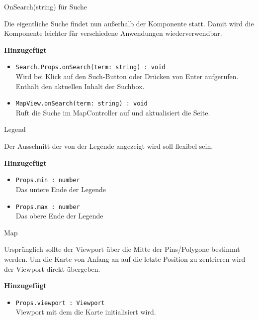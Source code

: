 \begin{Change}{OnSearch(string) für Suche}
    
    Die eigentliche Suche findet nun außerhalb der Komponente statt.
    Damit wird die Komponente leichter für verschiedene Anwendungen wiederverwendbar.

    \bigskip
    \textbf{Hinzugefügt}
    \begin{itemize}
        \item \texttt{Search.Props.onSearch(term: string) : void}
        \\ Wird bei Klick auf den Such-Button oder Drücken von Enter aufgerufen.
        Enthält den aktuellen Inhalt der Suchbox. 
        \item \texttt{MapView.onSearch(term: string) : void}
        \\ Ruft die Suche im MapController auf und aktualisiert die Seite.
    \end{itemize}

\end{Change}

\begin{Change}{Legend}
    
    Der Ausschnitt der von der Legende angezeigt wird soll flexibel sein.

    \bigskip
    \textbf{Hinzugefügt}
    \begin{itemize}
        \item \texttt{Props.min : number}
        \\ Das untere Ende der Legende
        \item \texttt{Props.max : number}
        \\ Das obere Ende der Legende
    \end{itemize}

\end{Change}

\begin{Change}{Map}
    
    Ursprünglich sollte der Viewport über die Mitte der Pins/Polygone bestimmt werden.
    Um die Karte von Anfang an auf die letzte Position zu zentrieren wird der Viewport direkt übergeben.
    
    \bigskip
    \textbf{Hinzugefügt}
    \begin{itemize}
        \item \texttt{Props.viewport : Viewport}
        \\ Viewport mit dem die Karte initialisiert wird.
    \end{itemize}

\end{Change}

